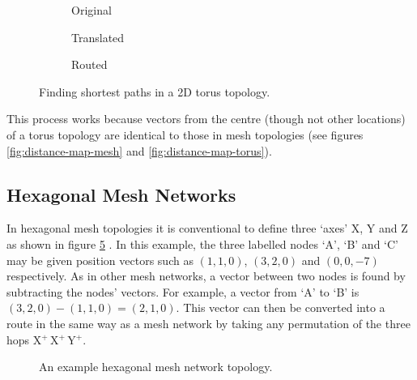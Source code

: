 			\begin{figure}
				\center
				\begin{subfigure}{0.3\linewidth}
					\center
					\caption{Original}
					\label{fig:torus-shortest-path-example}
				\end{subfigure}
				\begin{subfigure}{0.3\linewidth}
					\center
					\caption{Translated}
					\label{fig:torus-shortest-path-translate}
				\end{subfigure}
				\begin{subfigure}{0.3\linewidth}
					\center
					\caption{Routed}
					\label{fig:torus-shortest-path-routed}
				\end{subfigure}
				
				\caption{Finding shortest paths in a 2D torus topology.}
				\label{fig:torus-shortest-path}
			\end{figure}
			
			This process works because vectors from the centre (though not other
			locations) of a torus topology are identical to those in mesh topologies
			(see figures \ref{fig:distance-map-mesh} and
			\ref{fig:distance-map-torus}).
		
		\subsection{Hexagonal Mesh Networks}
			
			In hexagonal mesh topologies it is conventional to define three `axes' X,
			Y and Z as shown in figure \ref{fig:hex-mesh-topology-coordinates}
			\cite{patel15}. In this example, the three labelled nodes `A', `B' and
			`C' may be given position vectors such as $(1, 1, 0)$, $(3, 2, 0)$ and
			$(0, 0, -7)$ respectively. As in other mesh networks, a vector between
			two nodes is found by subtracting the nodes' vectors. For example, a
			vector from `A' to `B' is $(3, 2, 0) - (1, 1, 0) = (2, 1, 0)$. This
			vector can then be converted into a route in the same way as a mesh
			network by taking any permutation of the three hops  X$^+\,$X$^+\,$Y$^+$.
			
			\begin{figure}
				\center
				\caption{An example hexagonal mesh network topology.}
				\label{fig:hex-mesh-topology-coordinates}
			\end{figure}
			

